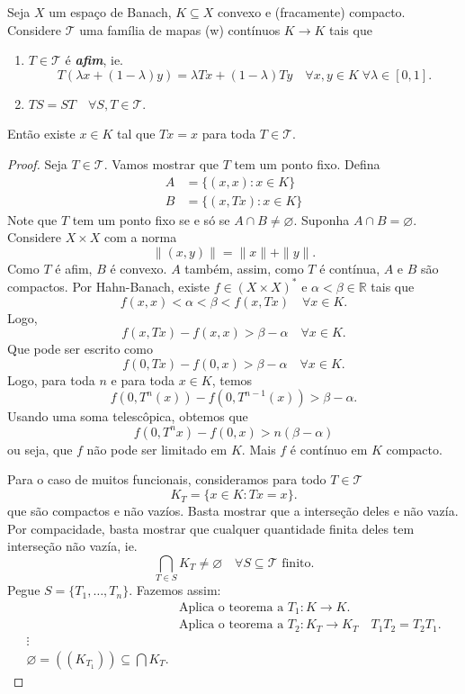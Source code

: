 \documentclass[portuguese]{article}
\theoremstyle{definition}
\newcommand{\R}{\mathbb{R}}
\begin{document}
\begin{teo}
	Seja $X$ um espaço de Banach, $K\subseteq X$ convexo e (fracamente) compacto. Considere $\mathcal{T}$ uma família de mapas (w) contínuos $K\to K$ tais que
	\begin{enumerate}
		\item $T\in\mathcal{T}$ é \textbf{\textit{afim}}, ie.
		\[T(\lambda x+(1-\lambda)y)=\lambda Tx+(1-\lambda)Ty\quad\forall x,y\in K\;\forall\lambda\in[0,1].\]
		\item $TS=ST\quad\forall S,T\in\mathcal{T}$.
	\end{enumerate}
	Então existe $x\in K$ tal que $Tx=x$ para toda $T\in\mathcal{T}$.
\end{teo}
\begin{proof}
	Seja $T\in\mathcal{T}$. Vamos mostrar que $T$ tem um ponto fixo. Defina
	\begin{align*}
		A&=\{(x,x):x\in K\}\\
		B&=\{(x,Tx):x\in K\}
	\end{align*}
	Note que $T$ tem um ponto fixo se e só se $A\cap B\neq\varnothing$. Suponha $A\cap B=\varnothing$. Considere $X\times X$ com a norma
	\[\|(x,y)\|=\|x\|+\|y\|.\]
	Como $T$ é afim, $B$ é convexo. $A$ também, assim, como $T$ é contínua, $A$ e $B$ são compactos. Por Hahn-Banach, existe $f\in (X\times X)^*$ e $\alpha<\beta\in\R$ tais que
	\[f(x,x)<\alpha<\beta<f(x,Tx)\quad\forall x\in K.\]
	Logo,
	\[f(x,Tx)-f(x,x)>\beta-\alpha\quad\forall x\in K.\]
	Que pode ser escrito como
	\[f(0,Tx)-f(0,x)>\beta-\alpha\quad\forall x\in K.\]
	Logo, para toda $n$ e para toda $x\in K$, temos
	\[f(0,T^n(x))-f(0,T^{n-1}(x))>\beta-\alpha.\]
	Usando uma soma telescôpica, obtemos que
	\[f(0,T^nx)-f(0,x)>n(\beta-\alpha)\]
	ou seja, que $f$ não pode ser limitado em $K$. Mais $f$ é contínuo em $K$ compacto.
	
	Para o caso de muitos funcionais, consideramos para todo $T\in\mathcal{T}$
	\[K_T=\{x\in K:Tx=x\}.\]
	que são compactos e não vazíos. Basta mostrar que a interseção deles e não vazía. Por compacidade, basta mostrar que cualquer quantidade finita deles tem interseção não vazía, ie.
	\[\bigcap_{T\in S}K_T\neq\varnothing\quad\forall S\subseteq \mathcal{T}\text{ finito}.\]
	Pegue $S=\{T_1,\ldots,T_n\}$. Fazemos assim:
	\begin{align*}
		&\text{Aplica o teorema a }T_1:K\to K.\\
		&\text{Aplica o teorema a }T_2:K_T\to K_T\quad T_1T_2=T_2T_1.\\
		\vdots\\
		\varnothing=((K_{T_1}))\subseteq \bigcap K_T.
	\end{align*}
\end{proof}
\end{document}
